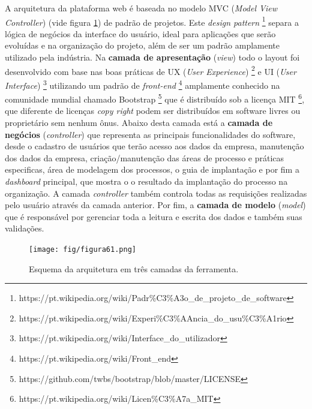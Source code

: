 A arquitetura da plataforma web é baseada no modelo MVC (\textit{Model View Controller}) \cite{Reenskaug1979} (vide figura \ref{fig:fig61}) de padrão de projetos. Este \textit{design pattern} \footnote{https://pt.wikipedia.org/wiki/Padr\%C3\%A3o_de_projeto_de_software} separa a lógica de negócios da interface do usuário, ideal para aplicações que serão evoluídas e na organização do projeto, além de ser um padrão amplamente utilizado pela indústria. Na \textbf{camada de apresentação} (\textit{view}) todo o layout foi desenvolvido com base nas boas práticas de UX (\textit{User Experience}) \footnote{https://pt.wikipedia.org/wiki/Experi\%C3\%AAncia_do_usu\%C3\%A1rio} e UI (\textit{User Interface}) \footnote{https://pt.wikipedia.org/wiki/Interface_do_utilizador} utilizando um padrão de \textit{front-end} \footnote{https://pt.wikipedia.org/wiki/Front_end} amplamente conhecido na comunidade mundial chamado Bootstrap \footnote{https://github.com/twbs/bootstrap/blob/master/LICENSE} que é distribuído sob a licença MIT \footnote{https://pt.wikipedia.org/wiki/Licen\%C3\%A7a_MIT}, que diferente de licenças \textit{copy right} podem ser distribuídos em software livres ou proprietário sem nenhum ônus. Abaixo desta camada está a \textbf{camada de negócios} (\textit{controller}) que representa as principais funcionalidades do software, desde o cadastro de usuários que terão acesso aos dados da empresa, manutenção dos dados da empresa, criação/manutenção das áreas de processo e práticas especificas, área de modelagem dos processos, o guia de implantação e por fim a \textit{dashboard} principal, que mostra o o resultado da implantação do processo na organização. A camada \textit{controller} também controla todas as requisições realizadas pelo usuário através da camada anterior. Por fim, a \textbf{camada de modelo} (\textit{model}) que é responsável por gerenciar toda a leitura e escrita dos dados e também suas validações.

\begin{figure}[H]
\centering
\texttt{[image: fig/figura61.png]}
\caption{Esquema da arquitetura em três camadas da ferramenta.}
\label{fig:fig61}
\end{figure}

